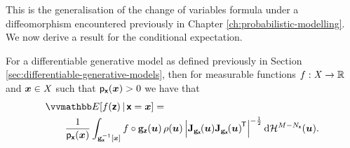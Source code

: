 This is the generalisation of the change of variables formula under a diffeomorphism encountered previously in Chapter \ref{ch:probabilistic-modelling}. We now derive a result for the conditional expectation.
\begin{proposition}
For a differentiable generative model as defined previously in Section \ref{sec:differentiable-generative-models}, then for measurable functions $f : \mathit{X} \to \mathbb{R}$ and $\boldsymbol{x} \in \mathit{X}$ such that $\mathsf{p}_{\boldsymbol{\mathsf{x}}}(\boldsymbol{x}) > 0$ we have that
\begin{equation}\label{eq:cond-expectation-input-space}
\begin{split}
  &\expc{f(\rvct{z}) \gvn \rvct{x}=\vct{x}}
  =\,\\
  &\qquad
  \frac{1}{\pden{\rvct{x}}({\vct{x}})}
  \int_{\preimage{\genfunc_{\rvct{x}}}{\vct{x}}}
    f\circ\genfunc_{\rvct{z}}(\vct{u}) \, \rho(\vct{u}) \,
    {\left|\jacob{\genfunc_{\rvct{x}}}{\vct{u}}\jacob{\genfunc_{\rvct{x}}}{\vct{u}}\tr\right|^{-\frac{1}{2}}}
  \,\dr\haum{M-N_{\rvct{x}}}(\vct{u}).
\end{split}
\end{equation}
\end{proposition}
